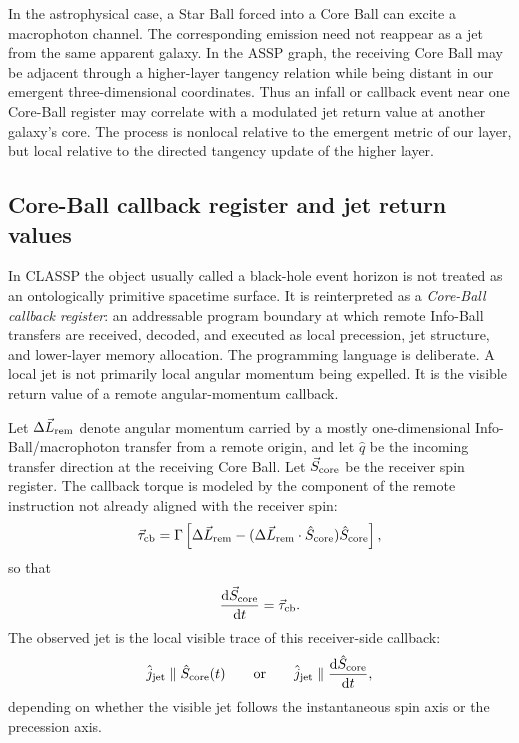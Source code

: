 \documentclass[11pt,a4paper]{article}
\newcommand{\dd}{\mathrm{d}}
\begin{document}
In the astrophysical case, a Star Ball forced into a Core Ball can excite a
macrophoton channel.  The corresponding emission need not reappear as a jet
from the same apparent galaxy.  In the ASSP graph, the receiving Core Ball may
be adjacent through a higher-layer tangency relation while being distant in
our emergent three-dimensional coordinates.  Thus an infall or callback event near one
Core-Ball register may correlate with a modulated jet return value at another
galaxy's core.  The process is nonlocal relative to the emergent metric of our
layer, but local relative to the directed tangency update of the higher layer.


\subsection{Core-Ball callback register and jet return values}
\label{sec:core_callback_register}

In CLASSP the object usually called a black-hole event horizon is not treated
as an ontologically primitive spacetime surface.  It is reinterpreted as a
\emph{Core-Ball callback register}: an addressable program boundary at which
remote Info-Ball transfers are received, decoded, and executed as local
precession, jet structure, and lower-layer memory allocation.  The programming
language is deliberate.  A local jet is not primarily local angular momentum
being expelled.  It is the visible return value of a remote angular-momentum
callback.

Let \(\Delta\vec L_{\rm rem}\) denote angular momentum carried by a mostly
one-dimensional Info-Ball/macrophoton transfer from a remote origin, and let
\(\hat q\) be the incoming transfer direction at the receiving Core Ball.  Let
\(\vec S_{\rm core}\) be the receiver spin register.  The callback torque is
modeled by the component of the remote instruction not already aligned with the
receiver spin:
\begin{equation}
  \vec\tau_{\rm cb}
  =
  \Gamma
  \left[
  \Delta\vec L_{\rm rem}
  -
  (\Delta\vec L_{\rm rem}\cdot\hat S_{\rm core})\hat S_{\rm core}
  \right],
  \label{eq:callback_torque}
\end{equation}
so that
\begin{equation}
  \frac{\dd\vec S_{\rm core}}{\dd t}=\vec\tau_{\rm cb}.
  \label{eq:core_spin_callback}
\end{equation}
The observed jet is the local visible trace of this receiver-side callback:
\begin{equation}
  \hat j_{\rm jet}\parallel\hat S_{\rm core}(t)
  \qquad\text{or}\qquad
  \hat j_{\rm jet}\parallel
  \frac{\dd\hat S_{\rm core}}{\dd t},
  \label{eq:jet_return_value}
\end{equation}
depending on whether the visible jet follows the instantaneous spin axis or
the precession axis.
\end{document}
